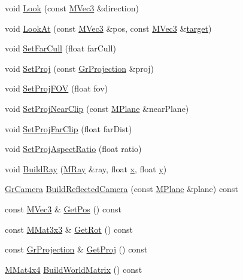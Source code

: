 \begin{CompactItemize}
\item 
void \hyperlink{class_gr_camera_2a10b8915e3841e221e4f7c4effedab0}{Look} (const \hyperlink{class_m_vec3}{MVec3} \&direction)
\item 
void \hyperlink{class_gr_camera_8106933669523efe81e1eef160d16d21}{LookAt} (const \hyperlink{class_m_vec3}{MVec3} \&pos, const \hyperlink{class_m_vec3}{MVec3} \&\hyperlink{glext_8h_f9d0cbbbeb7414e786c41899e5a856d7}{target})
\item 
void \hyperlink{class_gr_camera_d131bbb579ce7b219f113831f4ba3238}{SetFarCull} (float farCull)
\item 
void \hyperlink{class_gr_camera_56911b628538fe22dc75e9847cc93250}{SetProj} (const \hyperlink{class_gr_projection}{GrProjection} \&proj)
\item 
void \hyperlink{class_gr_camera_66224fc504eb32b51038fd50b23d29d0}{SetProjFOV} (float fov)
\item 
void \hyperlink{class_gr_camera_9396b50cce353396f3d8c7b9527632bb}{SetProjNearClip} (const \hyperlink{class_m_plane}{MPlane} \&nearPlane)
\item 
void \hyperlink{class_gr_camera_66c885e3c1bb18de63f4d21500565600}{SetProjFarClip} (float farDist)
\item 
void \hyperlink{class_gr_camera_56203851672d7957e5d0c0638e35475f}{SetProjAspectRatio} (float ratio)
\item 
void \hyperlink{class_gr_camera_3f8fbce375833a8c7e183c6a30f2e9f6}{BuildRay} (\hyperlink{class_m_ray}{MRay} \&ray, float \hyperlink{wglext_8h_d77deca22f617d3f0e0eb786445689fc}{x}, float \hyperlink{wglext_8h_9298c7ad619074f5285b32c6b72bfdea}{y})
\item 
\hyperlink{class_gr_camera}{GrCamera} \hyperlink{class_gr_camera_582cf3fc4ef7a58ede09464e80f05ade}{BuildReflectedCamera} (const \hyperlink{class_m_plane}{MPlane} \&plane) const 
\item 
const \hyperlink{class_m_vec3}{MVec3} \& \hyperlink{class_gr_camera_8cda9065741c39d298fe54d5ef0c3705}{GetPos} () const 
\item 
const \hyperlink{class_m_mat3x3}{MMat3x3} \& \hyperlink{class_gr_camera_466d702e7317ebe56a863745680e0133}{GetRot} () const 
\item 
const \hyperlink{class_gr_projection}{GrProjection} \& \hyperlink{class_gr_camera_c4d5422b4554d779a1810e7beebc8e4e}{GetProj} () const 
\item 
\hyperlink{class_m_mat4x4}{MMat4x4} \hyperlink{class_gr_camera_fbfe693f3ba2ae3b77de5c6886f72631}{BuildWorldMatrix} () const 
\item 

\end{CompactItemize}
